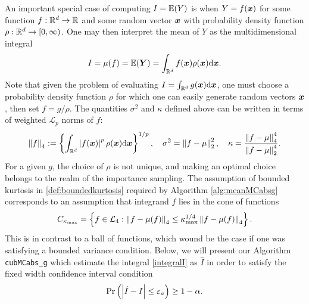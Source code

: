 \documentclass{iitthesis}
\theoremstyle{definition}
\begin{document}
An important special case of computing $I =\e(Y)$ is when $Y = f(\vx)$ for some function $f:\reals^d \to \reals$ and some random vector $\vx$ with probability density function $\rho: \reals^d \to [0,\infty)$. One may then interpret the mean of $Y$ as the multidimensional integral
\begin{align}\label{integralI}
I= \mu(f) = \e(\vY) = \int_{\reals^d}f(\boldsymbol{x})\rho(\vx)\dif \vx.
\end{align}
Note that given the problem of evaluating $I = \int_{\reals^d}g(\vx)\dif\vx$, one must choose a probability density function $\rho$ for which one can easily generate random vectors $\vx$, then set $f = g/\rho$. The quantities $\sigma^2$ and $\kappa$ defined above can be written in terms of weighted $\mathcal{L}_p$ norms of $f$:
\begin{align*}
\norm[4]{f}:=\left\{ \int_{\reals^d}\abs{f(\vx)}^p\rho(\vx)\dif\vx\right\}^{1/p}, \quad \sigma^2 = \norm[2]{f-\mu}^2,\quad \kappa = \frac{\norm[4]{f-\mu}^4}{\norm[2]{f-\mu}^4}.
\end{align*}
For a given $g$, the choice of $\rho$ is not unique, and making an optimal choice belongs to the realm of the importance sampling. The assumption of bounded kurtosis in \eqref{def:boundedkurtosis} required by Algorithm \ref{alg:meanMCabsg} corresponds to an assumption that integrand $f$ lies in the cone of functions \cite{CDHHZ13}
\begin{align*}
C_{\kmax} = \left\{ f \in \mathcal{L}_4: \norm[4]{f-\mu(f)} \leq \kmax^{1/4} \norm[4]{f-\mu(f)}\right\}.
\end{align*}
This is in contrast to a ball of functions, which wound be the case if one was satisfying a bounded variance condition.
Below, we will present our Algorithm {\tt cubMCabs\_g} which estimate the integral \eqref{integralI}
as $\hat{I}$ in order to satisfy the fixed width confidence interval condition
\begin{align}\label{cubMCabsgCI}
\Pr \left(\abs{\hat{I}-I} \leq \varepsilon_a \right) \geq 1-\alpha.
\end{align}

\label{sec:cubMCabsg}
\end{document}
